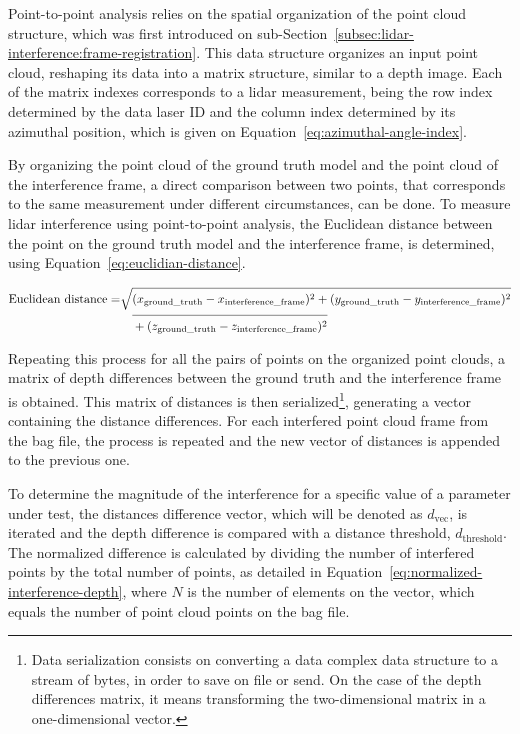 Point-to-point analysis relies on the spatial organization of the point cloud structure, which was first introduced on sub-Section~\ref{subsec:lidar-interference:frame-registration}. This data structure organizes an input point cloud, reshaping its data into a matrix structure, similar to a depth image. Each of the matrix indexes corresponds to a \ac{lidar} measurement, being the row index determined by the data \ac{laser} ID and the column index determined by its azimuthal position, which is given on Equation~\eqref{eq:azimuthal-angle-index}. 

By organizing the point cloud of the ground truth model and the point cloud of the interference frame, a direct comparison between two points, that corresponds to the same measurement under different circumstances, can be done. To measure \ac{lidar} interference using point-to-point analysis, the Euclidean distance between the point on the ground truth model and the interference frame, is determined, using Equation~\eqref{eq:euclidian-distance}.

\begin{equation}
\label{eq:euclidian-distance}
\begin{split}
\displaystyle
\text{Euclidean distance} = & \sqrt{(x_{\text{ground\_truth}} - x_{\text{interference\_frame}})^2 + (y_{\text{ground\_truth}} - y_{\text{interference\_frame}})^2} \\
														& \displaystyle \quad \overline{\rule{0pt}{2.5ex} + (z_{\text{ground\_truth}} - z_{\text{interference\_frame}})^2 }
\end{split}
\end{equation}

Repeating this process for all the pairs of points on the organized point clouds, a matrix of depth differences between the ground truth and the interference frame is obtained. This matrix of distances is then serialized\footnote{Data serialization consists on converting a data complex data structure to a stream of bytes, in order to save on file or send. On the case of the depth differences matrix, it means transforming the two-dimensional matrix in a one-dimensional vector.}, generating a vector containing the distance differences. For each interfered point cloud frame from the bag file, the process is repeated and the new vector of distances is appended to the previous one. 

To determine the magnitude of the interference for a specific value of a parameter under test, the distances difference vector, which will be denoted as $d_\text{vec}$, is iterated and the depth difference is compared with a distance threshold, $d_\text{threshold}$. The normalized difference is calculated by dividing the number of interfered points by the total number of points, as detailed in Equation~\eqref{eq:normalized-interference-depth}, where $N$ is the number of elements on the vector, which equals the number of point cloud points on the bag file.

